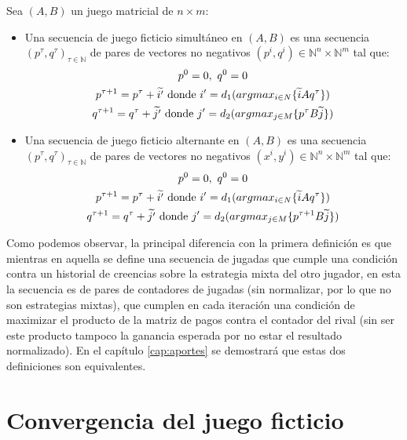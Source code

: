 \begin{definition} \label{def:fp:brandt}
    Sea $(A, B)$ un juego matricial de $n \times m$:
    \begin{itemize}
        \item Una secuencia de juego ficticio simultáneo en $(A, B)$ es una secuencia $(p^\tau, q^\tau)_{\tau \in \mathbb{N}}$ de pares de vectores no negativos $(p^i, q^i) \in \mathbb{N}^n \times \mathbb{N}^m$ tal que:
        \begin{gather*}
            p^0 = \boldmath{0},\ q^0 = \boldmath{0} \\
            p^{\tau+1} = p^{\tau} + \widetilde{i'} \text{\ donde $i' = d_1(argmax_{i \in N}\{\widetilde{i}Aq^\tau\})$} \\
            q^{\tau+1} = q^{\tau} + \widetilde{j'} \text{\ donde $j' = d_2(argmax_{j \in M}\{p^{\tau}B\widetilde{j}\})$}
        \end{gather*}
        \item Una secuencia de juego ficticio alternante en $(A, B)$ es una secuencia $(p^\tau, q^\tau)_{\tau \in \mathbb{N}}$  de pares de vectores no negativos $(x^i, y^i) \in \mathbb{N}^n \times \mathbb{N}^m$ tal que:
        \begin{gather*}
            p^0 = \boldmath{0},\ q^0 = \boldmath{0} \\
            p^{\tau+1} = p^{\tau} + \widetilde{i'} \text{\ donde $i' = d_1(argmax_{i \in N}\{\widetilde{i}Aq^\tau\})$} \\
            q^{\tau+1} = q^{\tau} + \widetilde{j'} \text{\ donde $j' = d_2(argmax_{j \in M}\{p^{\tau+1}B\widetilde{j}\})$}
        \end{gather*}
    \end{itemize}
\end{definition}

Como podemos observar, la principal diferencia con la primera definición es que mientras en aquella se define una secuencia de jugadas que cumple una condición contra un historial de creencias sobre la estrategia mixta del otro jugador, en esta la secuencia es de pares de contadores de jugadas (sin normalizar, por lo que no son estrategias mixtas), que cumplen en cada iteración una condición de maximizar el producto de la matriz de pagos contra el contador del rival (sin ser este producto tampoco la ganancia esperada por no estar el resultado normalizado). En el capítulo \ref{cap:aportes} se demostrará que estas dos definiciones son equivalentes.

\section{Convergencia del juego ficticio}

